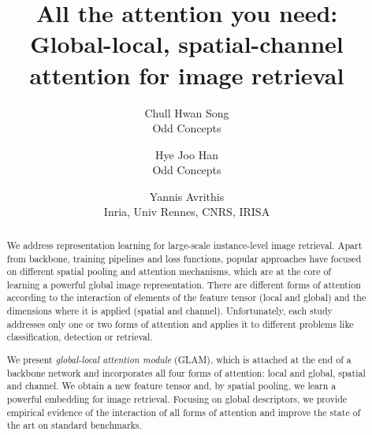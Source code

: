 \documentclass[10pt,twocolumn,letterpaper]{article}
\begin{document}
\title{All the attention you need:\\Global-local, spatial-channel attention for image retrieval}

\author{Chull Hwan Song\\
{\small Odd Concepts}
\and
Hye Joo Han\\
{\small Odd Concepts}
\and
Yannis Avrithis\\
{\small Inria, Univ Rennes, CNRS, IRISA}
}

\maketitle




\begin{abstract}
We address representation learning for large-scale instance-level image retrieval. Apart from backbone, training pipelines and loss functions, popular approaches have focused on different spatial pooling and attention mechanisms, which are at the core of learning a powerful global image representation. There are different forms of attention according to the interaction of elements of the feature tensor (local and global) and the dimensions where it is applied (spatial and channel). Unfortunately, each study addresses only one or two forms of attention and applies it to different problems like classification, detection or retrieval.

We present \emph{global-local attention module} (GLAM), which is attached at the end of a backbone network and incorporates all four forms of attention: local and global, spatial and channel. We obtain a new feature tensor and, by spatial pooling, we learn a powerful embedding for image retrieval.
Focusing on global descriptors, we provide empirical evidence of the interaction of all forms of attention and improve the state of the art on standard benchmarks.
\end{abstract}









{\small


}
\end{document}
